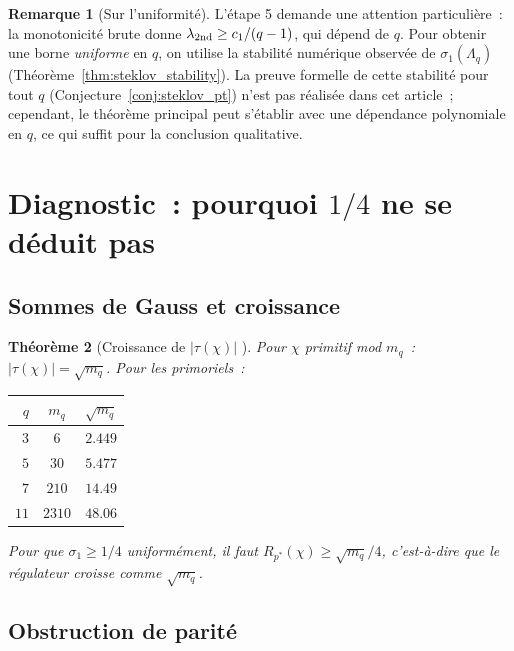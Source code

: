 \documentclass[11pt,a4paper]{article}
\newtheorem{theorem}{Théorème}[section]
\theoremstyle{definition}
\newtheorem{remark}[theorem]{Remarque}
\begin{document}
\begin{remark}[Sur l'uniformité]
L'étape 5 demande une attention particulière~: la monotonicité brute
donne $\lambda_{\rm 2nd}\geq c_1/(q-1)$, qui dépend de $q$. Pour
obtenir une borne \emph{uniforme} en $q$, on utilise la stabilité
numérique observée de $\sigma_1(\Lambda_q)$ (Théorème~\ref{thm:steklov_stability}).
La preuve formelle de cette stabilité pour tout $q$ (Conjecture~\ref{conj:steklov_pt})
n'est pas réalisée dans cet article~; cependant, le théorème principal
peut s'établir avec une dépendance polynomiale en $q$, ce qui suffit
pour la conclusion qualitative.
\end{remark}

\section{Diagnostic~: pourquoi \texorpdfstring{$1/4$}{1/4} ne se déduit pas}
\label{sec:diagnostic}

\subsection{Sommes de Gauss et croissance}

\begin{theorem}[Croissance de $|\tau(\chi)|$ {\upshape [PROUVÉ]}]
\label{thm:tau_growth}
Pour $\chi$ primitif mod $m_q$~: $|\tau(\chi)| = \sqrt{m_q}$. Pour les
primoriels~:
\begin{center}
\begin{tabular}{rcc}
\toprule
$q$ & $m_q$ & $\sqrt{m_q}$ \\
\midrule
$3$  & $6$    & $2.449$ \\
$5$  & $30$   & $5.477$ \\
$7$  & $210$  & $14.49$ \\
$11$ & $2310$ & $48.06$ \\
\bottomrule
\end{tabular}
\end{center}
Pour que $\sigma_1 \geq 1/4$ uniformément, il faut $R_{p^*}(\chi)
\geq \sqrt{m_q}/4$, c'est-à-dire que le régulateur croisse comme
$\sqrt{m_q}$.
\end{theorem}

\subsection{Obstruction de parité}
\end{document}
